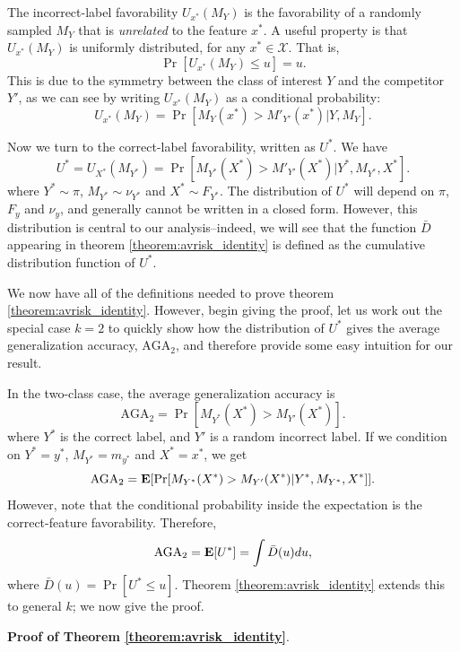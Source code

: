\documentclass[12pt]{article}
\begin{document}
The incorrect-label favorability $U_{x^*}(M_Y)$ is the favorability of a randomly sampled $M_Y$ that is \emph{unrelated} to the feature $x^*$.
A useful property is that $U_{x^*}(M_Y)$ is uniformly distributed, for any $x^* \in \mathcal{X}$.
That is,
\begin{equation}\label{eq:Uniform}
\Pr[U_{x^*}(M_Y) \leq u] = u.
\end{equation}
This is due to the symmetry between the class of interest $Y$ and the competitor $Y'$,
as we can see by writing $U_{x^*}(M_Y)$ as a conditional probability:
\begin{equation}
U_{x^*}(M_Y) = \Pr[M_{Y}(x^*) > M'_{Y'}(x^*)|Y,M_{Y}].
\end{equation}

Now we turn to the correct-label favorability, written as $U^*$.  We have
\begin{equation}
U^* = U_{X^*}(M_{Y^*}) = \Pr[M_{Y^*}(X^*) > M'_{Y'}(X^*)|Y^*,M_{Y^*},X^*].
\end{equation}
where $Y^* \sim \pi$, $M_{Y^*} \sim \nu_{Y^*}$ and $X^* \sim F_{Y^*}$.
The distribution of $U^*$ will depend on $\pi$, $F_y$ and $\nu_y$,
and generally cannot be written in a closed form.  
However, this distribution is central to our analysis--indeed, we will see that the function $\bar{D}$ appearing in theorem \ref{theorem:avrisk_identity} is defined as the cumulative distribution function of $U^*$.

We now have all of the definitions needed to prove theorem \ref{theorem:avrisk_identity}.  However, begin giving the proof, let us work out the special case $k=2$ to quickly show how the distribution of $U^*$ gives the average generalization accuracy, $\text{AGA}_2$, and therefore provide some easy intuition for our result.

In the two-class case, the average generalization accuracy is
\[
\text{AGA}_2 = \Pr[M_{Y^*}(X^*) > M_{Y'}(X^*)].
\]
where $Y^*$ is the correct label, and $Y'$ is a random incorrect label.
If we condition on $Y^* = y^*$, $M_{Y^*} = m_{y^*}$ and $X^* = x^*$, we get
\[
\text{AGA}_2 = \textbf{E}[\Pr[M_{Y^*}(X^*) > M_{Y'}(X^*)|Y^*, M_{Y^*}, X^*]].
\]
However, note that the conditional probability inside the expectation is the correct-feature favorability.  Therefore,
\[
\text{AGA}_2 = \textbf{E}[U^*] = \int \bar{D}(u) du,
\]
where $\bar{D}(u) = \Pr[U^* \leq u]$.
Theorem \ref{theorem:avrisk_identity} extends this to general $k$; we now give the proof.\newline

\noindent\textbf{Proof of Theorem \ref{theorem:avrisk_identity}}.
\end{document}
